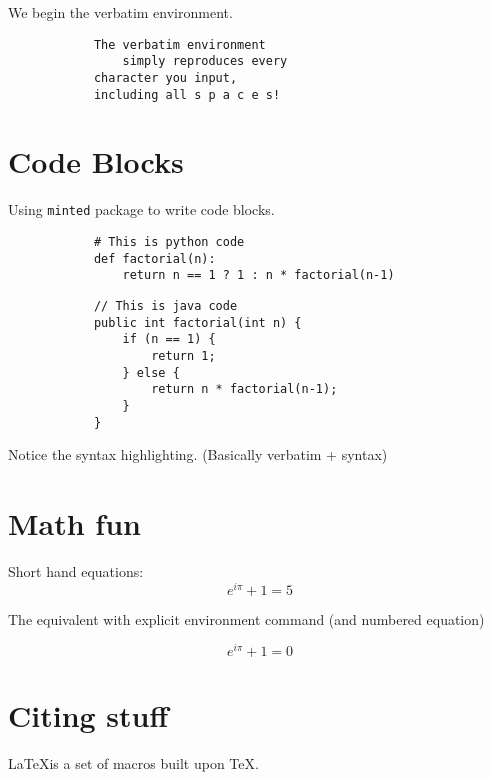 \documentclass[12pt]{article}
\begin{document}
        We begin the verbatim environment.

        \begin{verbatim}
            The verbatim environment
                simply reproduces every
            character you input,
            including all s p a c e s!
        \end{verbatim}

    \section{Code Blocks}

        Using \texttt{minted} package to write code blocks.

        \begin{verbatim}
            # This is python code
            def factorial(n):
                return n == 1 ? 1 : n * factorial(n-1)
        \end{verbatim}

        \begin{verbatim}
            // This is java code
            public int factorial(int n) {
                if (n == 1) {
                    return 1;
                } else {
                    return n * factorial(n-1);
                }
            }
        \end{verbatim}

        Notice the syntax highlighting. (Basically verbatim + syntax)

    \section{Math fun}
        Short hand equations: \[e^{i \pi} + 1 = 5\]

        The equivalent with explicit environment command (and numbered equation)

        \begin{equation}
            e^{i \pi} + 1 = 0
        \end{equation}
    
    \section{Citing stuff}
        \LaTeX is a set of macros built upon \TeX \cite{texbook}.
    
    
    
\end{document}
